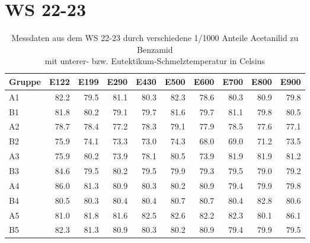 \section*{WS 22-23}
\begin{table}[h]
\centering \begin{tabular}{lrrrrrrrrr}
\toprule
Gruppe & E122 & E199 & E290 & E430 & E500 & E600 & E700 & E800 & E900 \\
\midrule
A1 & 82.2 & 79.5 & 81.1 & 80.3 & 82.3 & 78.6 & 80.3 & 80.9 & 79.8 \\
B1 & 81.8 & 80.2 & 79.1 & 79.7 & 81.6 & 79.7 & 81.1 & 79.8 & 80.5 \\
A2 & 78.7 & 78.4 & 77.2 & 78.3 & 79.1 & 77.9 & 78.5 & 77.6 & 77.1 \\
B2 & 75.9 & 74.1 & 73.3 & 73.0 & 74.3 & 68.0 & 69.0 & 71.2 & 73.5 \\
A3 & 75.9 & 80.2 & 73.9 & 78.1 & 80.5 & 73.9 & 81.9 & 81.9 & 81.2 \\
B3 & 84.6 & 79.5 & 80.2 & 79.5 & 79.9 & 79.3 & 79.5 & 79.0 & 79.2 \\
A4 & 86.0 & 81.3 & 80.9 & 80.3 & 80.2 & 80.9 & 79.4 & 79.9 & 79.8 \\
B4 & 80.5 & 80.3 & 80.4 & 80.4 & 80.7 & 80.7 & 80.4 & 82.8 & 80.6 \\
A5 & 81.0 & 81.8 & 81.6 & 82.5 & 82.6 & 82.2 & 82.3 & 80.1 & 86.1 \\
B5 & 82.3 & 81.3 & 80.9 & 80.3 & 80.2 & 80.9 & 79.4 & 79.9 & 79.5 \\
\bottomrule
\end{tabular}
\caption{Messdaten aus dem WS 22-23 durch verschiedene 1/1000 Anteile Acetanilid zu Benzamid\\mit unterer- bzw. Eutektikum-Schmelztemperatur in Celsius}
\end{table}
